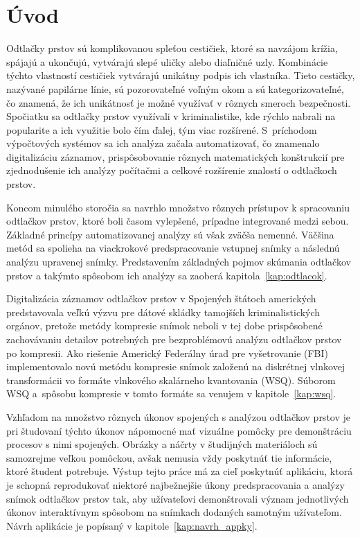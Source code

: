 \chapter{Úvod}
  Odtlačky prstov sú komplikovanou spleťou cestičiek, ktoré sa navzájom krížia, spájajú a ukončujú, vytvárajú slepé uličky alebo diaľničné uzly.
  Kombinácie týchto vlastností cestičiek vytvárajú unikátny podpis ich vlastníka. Tieto cestičky, nazývané papilárne línie, sú pozorovateľné
  voľným okom a sú kategorizovateľné, čo znamená, že ich unikátnosť je možné využívať v rôznych smeroch bezpečnosti. Spočiatku sa odtlačky prstov
  využívali v kriminalistike, kde rýchlo nabrali na popularite a ich využitie bolo čím ďalej, tým viac rozšírené. S~príchodom výpočtových systémov
  sa ich analýza začala automatizovať, čo znamenalo digitalizáciu záznamov, prispôsobovanie rôznych matematických konštrukcií pre zjednodušenie ich
  analýzy počítačmi a celkové rozšírenie znalostí o odtlačkoch prstov. 
  
  Koncom minulého storočia sa navrhlo množstvo rôznych prístupov k spracovaniu odtlačkov prstov, ktoré boli časom vylepšené, prípadne integrované
  medzi sebou. Základné princípy automatizovanej analýzy sú však zväčša nemenné. Väčšina metód sa spolieha na viackrokové predspracovanie
  vstupnej snímky a následnú analýzu upravenej snímky. Predstavením základných pojmov skúmania odtlačkov prstov a takýmto spôsobom ich analýzy
  sa zaoberá kapitola~{\ref{kap:odtlacok}}.

  Digitalizácia záznamov odtlačkov prstov v Spojených štátoch amerických predstavovala veľkú výzvu pre dátové skládky tamojších kriminalistických orgánov, pretože 
  metódy kompresie snímok neboli v tej dobe prispôsobené zachovávaniu detailov potrebných pre bezproblémovú analýzu odtlačkov prstov 
  po kompresii. Ako riešenie Americký Federálny úrad pre vyšetrovanie (FBI) implementovalo novú metódu kompresie snímok založenú na diskrétnej vlnkovej transformácii
  vo formáte vlnkového skalárneho kvantovania (WSQ). Súborom WSQ a~spôsobu kompresie v tomto formáte sa venujem v kapitole~{\ref{kap:wsq}}.

  Vzhľadom na množstvo rôznych úkonov spojených s analýzou odtlačkov prstov je pri študovaní týchto úkonov nápomocné mať vizuálne pomôcky
  pre demonštráciu procesov s nimi spojených. Obrázky a náčrty v študijných materiáloch sú samozrejme veľkou pomôckou, avšak nemusia vždy
  poskytnúť tie informácie, ktoré študent potrebuje. Výstup tejto práce má za cieľ poskytnúť aplikáciu, ktorá je schopná reprodukovať
  niektoré najbežnejšie úkony predspracovania a analýzy snímok odtlačkov prstov tak, aby užívateľovi demonštrovali význam jednotlivých úkonov
  interaktívnym spôsobom na snímkach dodaných samotným užívateľom. Návrh aplikácie je popísaný v kapitole~{\ref{kap:navrh_appky}}.
  
